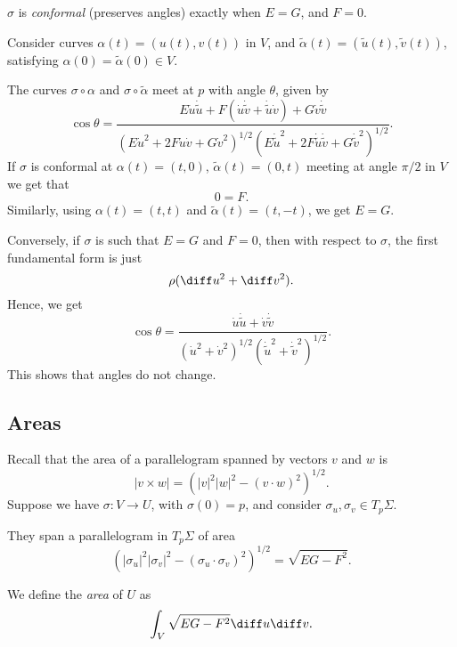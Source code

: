 \documentclass[12pt]{article}
\begin{document}
\begin{lemma}
	$\sigma$ is \emph{conformal} (preserves angles) exactly when $E = G$, and $F = 0$.
\end{lemma}

\begin{proofbox}
	Consider curves $\alpha(t) = (u(t), v(t))$ in $V$, and $\tilde \alpha(t) = (\tilde u(t), \tilde v(t))$, satisfying $\alpha(0) = \tilde \alpha(0) \in V$.

	The curves $\sigma \circ \alpha$ and $\sigma \circ \tilde \alpha$ meet at $p$ with angle $\theta$, given by
	\[
		\cos \theta = \frac{E \dot u \dot{\tilde u} + F(\dot u \dot{\tilde v} + \dot{\tilde u}\dot v) + G \dot v \dot{\tilde v}}{(E \dot u^2 + 2 F \dot u \dot v + G \dot v^2)^{1/2}(E \dot{\tilde u}^2 + 2 F \dot{\tilde u} \dot{\tilde v} + G \dot{\tilde v}^2)^{1/2}}
	.\]
	If $\sigma$ is conformal at $\alpha(t) = (t, 0)$, $\tilde \alpha(t) = (0,t)$ meeting at angle $\pi/2$ in $V$ we get that
	\[
	0 = F
	.\]
	Similarly, using $\alpha(t) = (t, t)$ and $\tilde \alpha(t) = (t, -t)$, we get $E = G$.

	Conversely, if $\sigma$ is such that $E = G$ and $F = 0$, then with respect to $\sigma$, the first fundamental form is just
	\[
	\rho(\diff u^2 + \diff v^2)
	.\]
	Hence, we get
	\[
		\cos \theta = \frac{\dot u \dot{\tilde u} + \dot v \dot{\tilde v}}{(\dot u^2 + \dot v^2)^{1/2}(\dot{\tilde u}^2 + \dot{\tilde v}^2)^{1/2}}
	.\]
	This shows that angles do not change.
\end{proofbox}

\subsection{Areas}
\label{sub:areas}

Recall that the area of a parallelogram spanned by vectors $v$ and $w$ is
\[
|v \times w| = (|v|^2|w|^2 - (v \cdot w)^2)^{1/2}
.\]
Suppose we have $\sigma : V \to U$, with $\sigma(0) = p$, and consider $\sigma_u, \sigma_v \in T_p \Sigma$.

They span a parallelogram in $T_p \Sigma$ of area
\[
	(|\sigma_u|^2|\sigma_v|^2 - (\sigma_u \cdot \sigma_v)^2)^{1/2} = \sqrt{EG - F^2}
.\]
\begin{definition}
	We define the \emph{area} of $U$ as
	\[
		\int_{V} \sqrt{EG - F^2} \diff u \diff v
	.\]
\end{definition}
\end{document}
